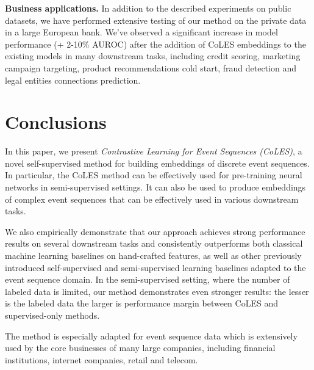 \documentclass[sigconf]{acmart}
\begin{document}
\textbf{Business applications.} In addition to the described experiments on public datasets, we have performed extensive testing of our method on the private data in a large European bank. We've observed a significant increase in model performance (+ 2-10\% AUROC) after the addition of CoLES embeddings to the existing models in many downstream tasks, including credit scoring, marketing campaign targeting, product recommendations cold start, fraud detection and legal entities connections prediction.


\section{Conclusions} \label{sec-conclusions}

In this paper, we present \emph{Contrastive Learning for Event Sequences (CoLES)}, a novel self-supervised method for building embeddings of discrete event sequences.
In particular, the CoLES method can be effectively used for pre-training neural networks in semi-supervised settings. It can also be used to produce embeddings of complex event sequences that can be effectively used in various downstream tasks.

We also empirically demonstrate that our approach achieves strong performance results on several downstream tasks and consistently outperforms both classical machine learning baselines on hand-crafted features, as well as other  previously introduced  self-supervised and semi-supervised learning baselines adapted to the event sequence domain.
In the semi-supervised setting, where the number of labeled data is limited, our method demonstrates even stronger results: the lesser is the labeled data the larger is performance margin between CoLES and supervised-only methods.

The method is especially adapted for event sequence data which is extensively used by the core businesses of many large companies, including financial institutions, internet companies, retail and telecom.
\end{document}
